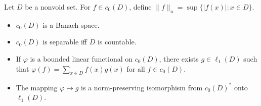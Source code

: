 Let $D$ be a nonvoid set. For $f \in c_0(D)$, define $\|f\|_u = \sup\{|f(x)| : x \in D\}$.
\begin{itemize}
\item[(a)] $c_0(D)$ is a Banach space.
\item[(b)] $c_0(D)$ is separable iff $D$ is countable.
\item[(c)] If $\varphi$ is a bounded linear functional on $c_0(D)$, there exists $g \in \ell_1(D)$ such that $\varphi(f) = \sum_{x \in D} f(x) g(x)$ for all $f \in c_0(D)$.
\item[(d)] The mapping $\varphi \mapsto g$ is a norm-preserving isomorphism from $c_0(D)^*$ onto $\ell_1(D)$.
\end{itemize}
